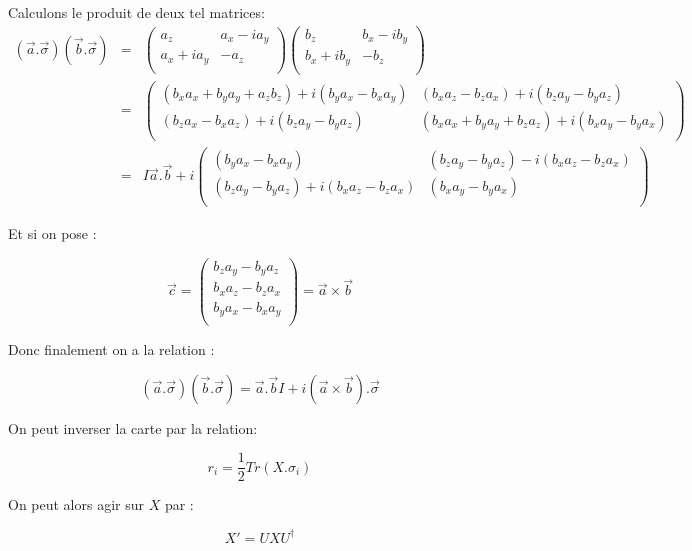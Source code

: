 \documentclass[12pt,a4paper]{article}
\begin{document}
Calculons le produit de deux tel matrices:
\begin{eqnarray*}
(\vec{a}.\vec{\sigma}) (\vec{b}.\vec{\sigma})&=&\begin{pmatrix}
a_z&a_x-i a_y\\
a_x+i a_y&-a_z\\
\end{pmatrix}
\begin{pmatrix}
b_z&b_x-i b_y\\
b_x+i b_y&-b_z\\
\end{pmatrix}\\
&=&
\begin{pmatrix}
(b_x a_x+ b_y a_y+a_z b_z)  +i (b_y a_x- b_x a_y)& (b_x a_z- b_z a_x) + i (b_z a_y- b_y a_z)  \\
(b_z a_x  - b_x a_z) + i(b_z a_y-b_y a_z)& (b_x a_x +b_y a_y+ b_z a_z)+ i (b_x a_y - b_y a_x )\\
\end{pmatrix}\\
&=&
I \vec{a}.\vec{b}+ i\begin{pmatrix}
(b_y a_x- b_x a_y)&   (b_z a_y- b_y a_z)-i(b_x a_z- b_z a_x)  \\
 (b_z a_y-b_y a_z)+i(b_x a_z - b_z a_x)& (b_x a_y - b_y a_x )\\
\end{pmatrix}
\end{eqnarray*}

Et si on pose :

\[
\vec{c}=\begin{pmatrix}
b_z a_y- b_y a_z\\
b_x a_z- b_z a_x\\
b_y a_x- b_x a_y\\
\end{pmatrix}= \vec{a}\times\vec{b}
\]

Donc finalement on a la relation :

\[
 \boxed{ (\vec{a}.\vec{\sigma}) (\vec{b}.\vec{\sigma}) = \vec{a}.\vec{b} I + i(\vec{a}\times\vec{b}).\vec{\sigma}}
\]

On peut inverser la carte par la relation:

\[
\boxed{r_i= \frac{1}{2} Tr(X.\sigma_i)}
\]

On peut alors agir sur $X$ par :

\[
	\boxed{ X'=U X U^{\dagger} }
\]
\end{document}
